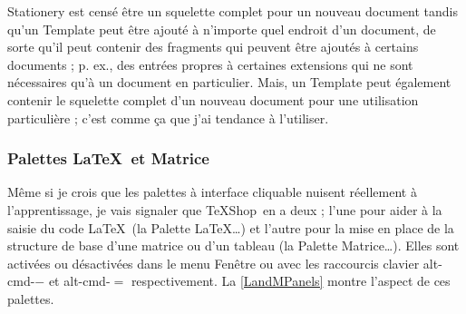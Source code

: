 \documentclass[11pt,french]{article}
\newcommand{\TS}{\textsf{\TeX Shop}}
\newcommand{\cmd}[1]{\textsf{#1}}
\newcommand{\mnu}[1]{\textsf{#1}}
\begin{document}

\cmd{Stationery} est censé être un squelette complet pour un nouveau document tandis qu'un \cmd{Template} peut être ajouté à n'importe quel endroit d'un document, de sorte qu'il peut contenir des fragments qui peuvent être ajoutés à certains documents ; p. ex., des entrées propres à certaines extensions qui ne sont nécessaires qu'à un document en particulier. Mais, un \cmd{Template} peut également contenir le squelette complet d'un nouveau document pour une utilisation particulière ; c'est comme ça que j'ai tendance à l'utiliser.


\subsubsection{Palettes \LaTeX\ et Matrice}

Même si je crois que les palettes à interface cliquable nuisent réellement à l'apprentissage, je vais signaler que \TS\ en a deux ; l'une pour aider à la saisie du code \LaTeX\ (la \mnu{Palette LaTeX…}) et l'autre pour la mise en place de la structure de base d'une matrice ou d'un tableau (la \mnu{Palette Matrice…}). Elles sont activées ou désactivées dans le menu \mnu{Fenêtre} ou avec les raccourcis clavier \cmd{alt-cmd-{}$-$} et \cmd{alt-cmd-$=$} respectivement. La \vref{LandMPanels} montre l'aspect de ces palettes.
\end{document}
